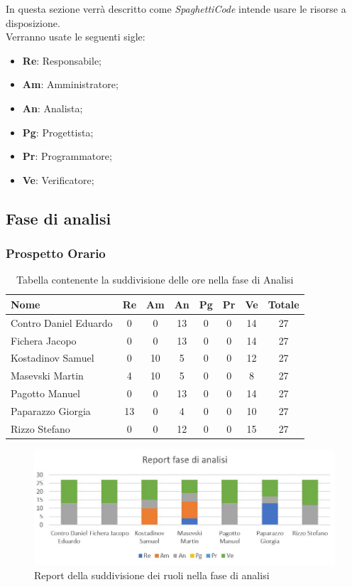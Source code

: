 \documentclass[../piano_di_progetto.tex]{subfiles}
\begin{document}
In questa sezione verrà descritto come \emph{SpaghettiCode} intende usare le risorse a disposizione. \\
Verranno usate le seguenti sigle:\par
\begin{itemize}
\item \textbf{Re}: Responsabile;
\item \textbf{Am}: Amministratore;
\item \textbf{An}: Analista;
\item \textbf{Pg}: Progettista;
\item \textbf{Pr}: Programmatore;
\item \textbf{Ve}: Verificatore;
\end{itemize}


\subsection{ Fase di analisi}%
\label{sub:fase_analisi}
\subsubsection{Prospetto Orario}


\begin{table}[!ht]
	\centering
	\begin{tabular}{|l|c|c|c|c|c|c|c|}
	\hline
	\rowcolor{lightgray}
	\textbf{Nome} & \textbf{Re} & \textbf{Am} & \textbf{An} & \textbf{Pg}  & \textbf{Pr}   & \textbf{Ve} & \textbf{Totale}\\
	\hline
		Contro Daniel Eduardo & 0 & 0 & 13 & 0 & 0 & 14 & 27 \\
		Fichera Jacopo & 0 & 0 & 13 & 0 & 0 & 14 & 27 \\
		Kostadinov Samuel & 0 & 10 & 5 & 0 & 0 & 12 & 27 \\			
		Masevski Martin & 4 & 10 & 5 & 0 & 0 & 8 & 27 \\
		Pagotto Manuel & 0 & 0 & 13 & 0 & 0 & 14 & 27 \\			
		Paparazzo Giorgia & 13 & 0 & 4 & 0 & 0 & 10 & 27 \\
		Rizzo Stefano & 0 & 0 & 12 & 0 & 0 & 15 & 27 \\
	\hline	
	\end{tabular}
	\caption{Tabella contenente la suddivisione delle ore nella fase di Analisi}
\end{table}

\begin{figure}[H]
\centering
\includegraphics[width=12cm]{img/report_analisi}
\caption{Report della suddivisione dei ruoli nella fase di analisi}
\end{figure}
\end{document}
